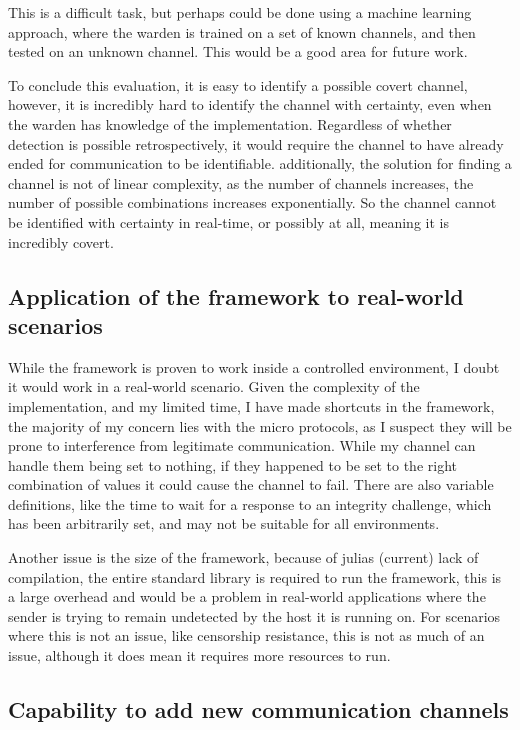 This is a difficult task, but perhaps could be done using a machine learning approach, where the warden is trained on a set of known channels, and then tested on an unknown channel. This would be a good area for future work.

To conclude this evaluation, it is easy to identify a possible covert channel, however, it is incredibly hard to identify the channel with certainty, even when the warden has knowledge of the implementation. Regardless of whether detection is possible retrospectively, it would require the channel to have already ended for communication to be identifiable. additionally, the solution for finding a channel is not of linear complexity, as the number of channels increases, the number of possible combinations increases exponentially. So the channel cannot be identified with certainty in real-time, or possibly at all, meaning it is incredibly covert.

\subsection{Application of the framework to real-world scenarios}

While the framework is proven to work inside a controlled environment, I doubt it would work in a real-world scenario. Given the complexity of the implementation, and my limited time, I have made shortcuts in the framework, the majority of my concern lies with the micro protocols, as I suspect they will be prone to interference from legitimate communication. While my channel can handle them being set to nothing, if they happened to be set to the right combination of values it could cause the channel to fail. There are also variable definitions, like the time to wait for a response to an integrity challenge, which has been arbitrarily set, and may not be suitable for all environments.

Another issue is the size of the framework, because of julias (current) lack of compilation, the entire standard library is required to run the framework, this is a large overhead and would be a problem in real-world applications where the sender is trying to remain undetected by the host it is running on. For scenarios where this is not an issue, like censorship resistance, this is not as much of an issue, although it does mean it requires more resources to run.


\subsection{Capability to add new communication channels}
\label{sec:new_channels}

